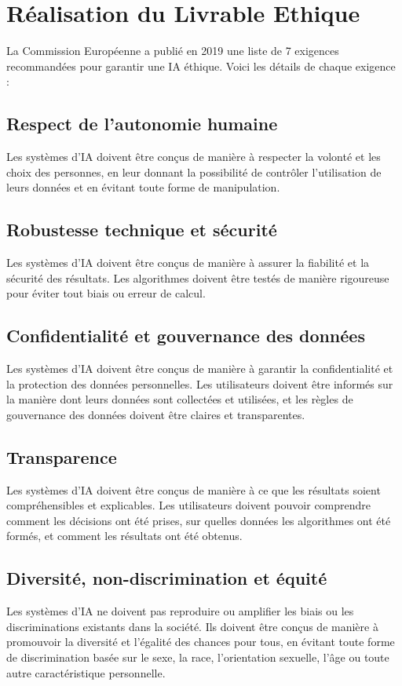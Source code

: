 \section{Réalisation du Livrable Ethique}

La Commission Européenne a publié en 2019 une liste de 7 exigences recommandées pour garantir une IA éthique. Voici les détails de chaque exigence :

\subsection{Respect de l'autonomie humaine}
Les systèmes d'IA doivent être conçus de manière à respecter la volonté et les choix des personnes, en leur donnant la possibilité de contrôler l'utilisation de leurs données et en évitant toute forme de manipulation.
\newpage
\subsection{Robustesse technique et sécurité}
Les systèmes d'IA doivent être conçus de manière à assurer la fiabilité et la sécurité des résultats. Les algorithmes doivent être testés de manière rigoureuse pour éviter tout biais ou erreur de calcul.
\newpage
\subsection{Confidentialité et gouvernance des données}
Les systèmes d'IA doivent être conçus de manière à garantir la confidentialité et la protection des données personnelles. Les utilisateurs doivent être informés sur la manière dont leurs données sont collectées et utilisées, et les règles de gouvernance des données doivent être claires et transparentes.
\newpage
\subsection{Transparence}
Les systèmes d'IA doivent être conçus de manière à ce que les résultats soient compréhensibles et explicables. Les utilisateurs doivent pouvoir comprendre comment les décisions ont été prises, sur quelles données les algorithmes ont été formés, et comment les résultats ont été obtenus. 
\newpage
\subsection{Diversité, non-discrimination et équité}
Les systèmes d'IA ne doivent pas reproduire ou amplifier les biais ou les discriminations existants dans la société. Ils doivent être conçus de manière à promouvoir la diversité et l'égalité des chances pour tous, en évitant toute forme de discrimination basée sur le sexe, la race, l'orientation sexuelle, l'âge ou toute autre caractéristique personnelle.
\newpage
